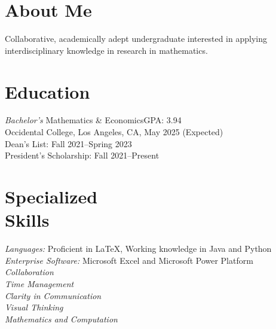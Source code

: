 \documentclass[margin, 10pt]{res} %
\begin{document}
\begin{resume}

\section{\sc About Me}
Collaborative, academically adept undergraduate interested in applying interdisciplinary knowledge in research in mathematics.

\section{\sc Education}

{\sl Bachelor's} Mathematics \& Economics\hfill GPA: 3.94 \\
Occidental College, Los Angeles, CA, May 2025 (Expected) \\
Dean's List: Fall 2021--Spring 2023\\
President's Scholarship: Fall 2021--Present

\section{\sc Specialized \\ Skills} 

{\sl Languages:} Proficient in \LaTeX, Working knowledge in Java and Python\\
{\sl Enterprise Software:} Microsoft Excel and Microsoft Power Platform\\
{\sl Collaboration}\\
{\sl Time Management}\\
{\sl Clarity in Communication}\\
{\sl Visual Thinking}\\
{\sl Mathematics and Computation}
 
 

\end{resume}
\end{document}
